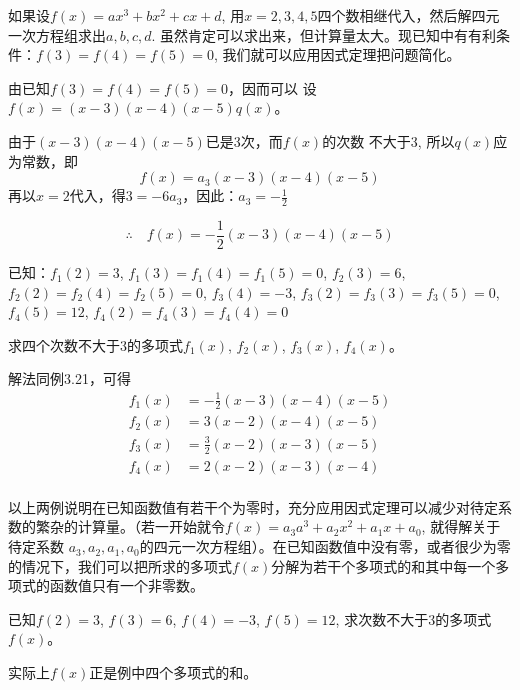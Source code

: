 \begin{analyze}
如果设$f(x)=ax^3+bx^2+cx+d$, 用$x=2, 3,
4, 5$四个数相继代入，然后解四元一次方程组求出$a,b,c,d$. 虽然肯定可以求出来，但计算量太大。现已知中有有利条件：$f(3)=f(4)=f(5)=0$, 我们就可以应用因式定理把问题简化。
\end{analyze}

\begin{solution}
    由已知$f(3)=f(4)=f(5)=0$，因而可以
    设$f(x)=(x-3)(x-4)(x-5)q(x)$。
    
    由于$(x-3)(x-4)(x-5)$已是3次，而$f(x)$的次数
不大于3, 所以$q(x)$应为常数，即
\[f(x)=a_3(x-3)(x-4)(x-5)\]
再以$x=2$代入，得$3=-6a_3$，因此：$a_3=-\frac{1}{2}$

\[\therefore\quad f(x)=-\frac{1}{2}(x-3)(x-4)(x-5)\]
\end{solution}


\begin{example}
已知：$f_1(2)=3$, $f_1(3)=f_1(4)=f_1(5)=0$, $f_2(3)=6$, $f_2(2)=f_2(4)=f_2(5)=0$, $f_3(4)=-3$, $f_3(2)=f_3(3)=f_3(5)=0$, $f_4(5)=12$, $f_4(2)=f_4(3)=f_4(4)=0$

求四个次数不大于3的多项式$f_1(x)$, $f_2(x)$, $f_3(x)$, $f_4(x)$。
\end{example}

\begin{solution}
    解法同例3.21，可得
\[\begin{split}
    f_1(x)&=-\frac{1}{2}(x-3)(x-4)(x-5)\\
    f_2(x)&=3(x-2)(x-4)(x-5)\\
    f_3(x)&=\frac{3}{2}(x-2)(x-3)(x-5)\\
    f_4(x)&={2}(x-2)(x-3)(x-4)\\
\end{split}\]
\end{solution}

以上两例说明在已知函数值有若干个为零时，充分应用因式定理可以减少对待定系数的繁杂的计算量。（若一开始就令$f(x) =a_3a^3+a_2x^2+a_1x+a_0$, 就得解关于待定系数 $a_3,a_2,a_1,a_0$的四元一次方程组）。在已知函数值中没有零，或者很少为零的情况下，我们可以把所求的多项式$f(x)$分解为若干个多项式的和其中每一个多项式的函数值只有一个非零数。


\begin{example}
    已知$f(2)=3$, $f(3)=6$, $f(4)=-3$, $f(5)=12$, 求次数不大于3的多项式$f(x)$。
\end{example}

\begin{analyze}
    实际上$f(x)$正是例中四个多项式的和。
\end{analyze}

